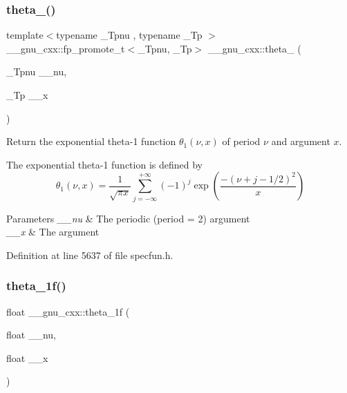 \subsubsection{\texorpdfstring{theta\+\_()}{theta\_1()}}
{\footnotesize\ttfamily template$<$typename \+\_\+\+Tpnu , typename \+\_\+\+Tp $>$ \\
\+\_\+\+\_\+gnu\+\_\+cxx\+::fp\+\_\+promote\+\_\+t$<$\+\_\+\+Tpnu, \+\_\+\+Tp$>$ \+\_\+\+\_\+gnu\+\_\+cxx\+::theta\+\_ (\begin{DoxyParamCaption}\item[{\+\_\+\+Tpnu}]{\+\_\+\+\_\+nu,  }\item[{\+\_\+\+Tp}]{\+\_\+\+\_\+x }\end{DoxyParamCaption})\hspace{0.3cm}{\ttfamily [inline]}}

Return the exponential theta-\/1 function $ \theta_1(\nu,x) $ of period $ \nu $ and argument $ x $.

The exponential theta-\/1 function is defined by \[ \theta_1(\nu,x) = \frac{1}{\sqrt{\pi x}} \sum_{j=-\infty}^{+\infty} (-1)^j \exp\left( \frac{-(\nu + j - 1/2)^2}{x} \right) \]


\begin{DoxyParams}{Parameters}
{\em \+\_\+\+\_\+nu} & The periodic (period = 2) argument \\
\hline
{\em \+\_\+\+\_\+x} & The argument \\
\hline
\end{DoxyParams}


Definition at line 5637 of file specfun.\+h.

\mbox{\label{group__gnu__math__spec__func_ga5bbf256b875da28132f9049f5984cb14}} 
\subsubsection{\texorpdfstring{theta\+\_\+1f()}{theta\_1f()}}
{\footnotesize\ttfamily float \+\_\+\+\_\+gnu\+\_\+cxx\+::theta\+\_\+1f (\begin{DoxyParamCaption}\item[{float}]{\+\_\+\+\_\+nu,  }\item[{float}]{\+\_\+\+\_\+x }\end{DoxyParamCaption})\hspace{0.3cm}{\ttfamily [inline]}}

